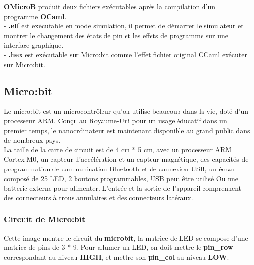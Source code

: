\documentclass[14px]{article}
\begin{document}
	\textbf{OMicroB} produit deux fichiers exécutables après la compilation d'un programme \textbf{OCaml}.\\
	- \textbf{.elf} est exécutable en mode simulation, il permet de démarrer le simulateur et montrer le changement des états de pin et les effets de programme sur une interface graphique.\\
	- \textbf{.hex} est exécutable sur Micro:bit comme l'effet fichier original OCaml exécuter sur Micro:bit.

	\subsection{Micro:bit}
	Le micro:bit est un microcontrôleur qu'on utilise beaucoup dans la vie, doté d'un processeur ARM. Conçu au Royaume-Uni pour un usage éducatif dans un premier temps, le nanoordinateur est maintenant disponible au grand public dans de nombreux pays.\\

	La taille de la carte de circuit est de 4 cm * 5 cm, avec un processeur ARM Cortex-M0, un capteur d'accélération et un capteur magnétique, des capacités de programmation de communication Bluetooth et de connexion USB, un écran composé de 25 LED, 2 boutons programmables, USB peut être utilisé Ou une batterie externe pour alimenter. L'entrée et la sortie de l'appareil comprennent des connecteurs à trous annulaires et des connecteurs latéraux.

	\subsubsection{Circuit de Micro:bit}
	Cette image montre le circuit du \textbf{microbit}, la matrice de LED se compose d'une matrice de pins de 3 * 9. Pour allumer un LED, on doit mettre le \textbf{pin\_row} correspondant au niveau \textbf{HIGH}, et mettre son \textbf{pin\_col} au niveau \textbf{LOW}.
	\begin{figure}
	\end{figure}
\end{document}
